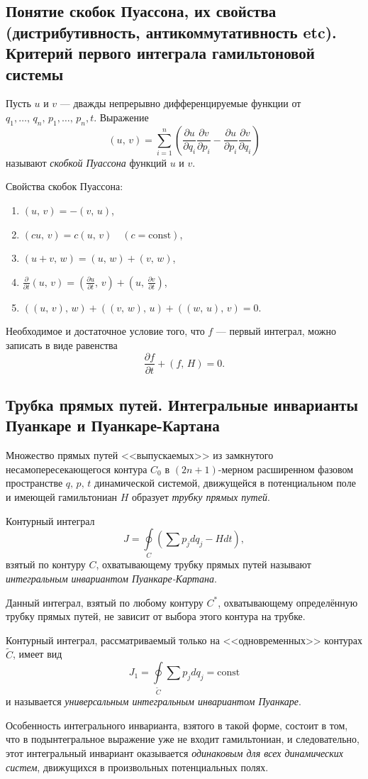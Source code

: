 \documentclass[a4paper,12pt]{article}
\begin{document}
\subsection{Понятие скобок Пуассона, их свойства (дистрибутивность,
антикоммутативность etc). Критерий первого интеграла гамильтоновой
системы}
\begin{dfn}
	Пусть $u$ и $v$ --- дважды непрерывно дифференцируемые функции от
	$q_1,\ldots,\,q_n,\,p_1,\ldots,\,p_n,t$. Выражение
	\[
		(u,\,v)= \sum_{i=1}^{n}\left( \frac{\partial u}{\partial q_i}
		\frac{\partial v}{\partial p_i} -\frac{\partial u}{\partial p_i} 
	\frac{\partial v}{\partial q_i} \right)
	\] 
	называют \emph{скобкой Пуассона} функций $u$ и $v$.
\end{dfn}
Свойства скобок Пуассона:
\begin{enumerate}
	\item $(u,\,v)=-(v,\,u)$,
	\item $(cu,\,v)=c(u,\,v) \quad (c=\mathrm{const})$,
	\item $(u+v,\,w)=(u,\,w)+(v,\,w)$,
	\item $\displaystyle \frac{\partial }{\partial t} (u,\,v)=
		\left( \frac{\partial u}{\partial t} ,\,v \right) +
		\left(u,\,\frac{\partial v}{\partial t}\right) $,
	\item $((u,\,v),\,w)+((v,\,w),\,u)+((w,\,u),\,v)=0$.
\end{enumerate}
Необходимое и достаточное  условие того, что $f$ --- первый интеграл, можно
записать в виде равенства
\[
	\frac{\partial f}{\partial t} +(f,\,H)=0
.\] 
\subsection{Трубка прямых путей. Интегральные инварианты Пуанкаре и
Пуанкаре-Картана}
\begin{dfn}
	Множество прямых путей <<выпускаемых>> из замкнутого
	несамопересекающегося контура $C_0$ в $(2n+1)$-мерном расширенном
	фазовом пространстве $q,\,p,\,t$ динамической системой, движущейся
	в потенциальном поле и имеющей гамильтониан $H$ образует \emph{трубку
	прямых путей}.
\end{dfn}
\begin{dfn}
	Контурный интеграл
	\[
		J = \oint\limits_C \left(\sum p_j dq_j - Hdt\right),
	\] 
	 взятый по контуру $C$, охватывающему трубку прямых путей называют
	 \emph{интегральным инвариантом Пуанкаре-Картана}.
\end{dfn}
Данный интеграл, взятый по любому контуру $C^*$, охватывающему определённую
трубку прямых путей, не зависит от выбора этого контура на трубке.
\begin{dfn}
	Контурный интеграл, рассматриваемый только на <<одновременных>>
	контурах $\tilde{C}$, имеет  вид
	\[
		J_1 = \oint\limits_{\tilde{C}} \sum p_j dq_j=\mathrm{const}
	\]
	и называется \emph{универсальным интегральным инвариантом Пуанкаре}.
\end{dfn}
Особенность интегрального инварианта, взятого в такой форме, состоит в том, что
в подынтегральное выражение уже не входит гамильтониан, и следовательно, этот
интегральный инвариант оказывается \emph{одинаковым для всех динамических
систем}, движущихся в произвольных потенциальных полях.
\end{document}
